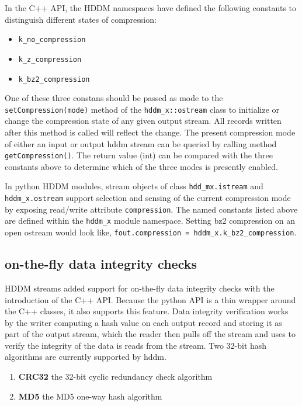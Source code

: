 \documentclass{revtex4}
\begin{document}
In the C++ API, the HDDM namespaces have defined the following constants
to distinguish different states of compression:

\begin{itemize}
\item \texttt{k\_no\_compression}
\item \texttt{k\_z\_compression}
\item \texttt{k\_bz2\_compression}
\end{itemize}

One of these three constans should be passed as mode to the 
\texttt{setCompression(mode)} method of the \texttt{hddm\_x::ostream}
class to initialize or change the compression state of any given output
stream. All records written after this method is called will reflect the
change. The present compression mode of either an input or output hddm
stream can be queried by calling method \texttt{getCompression()}.
The return value (int) can be compared with the three constants above
to determine which of the three modes is presently enabled.

In python HDDM modules, stream objects of class \texttt{hdd\_mx.istream}
and \texttt{hddm\_x.ostream} support selection and sensing of the current
compression mode by exposing read/write attribute \texttt{compression}.
The named constants listed above are defined within the \texttt{hddm\_x}
module namespace. Setting bz2 compression on an open ostream would look
like, \texttt{fout.compression = hddm\_x.k\_bz2\_compression}.

\subsection{on-{}the-{}fly data integrity checks}

HDDM streams added support for on-{}the-{}fly data integrity checks with
the introduction of the C++ API. Because the python API is a thin wrapper
around the C++ classes, it also supports this feature. Data integrity
verification works by the writer computing a hash value on each output
record and storing it as part of the output stream, which the reader then
pulls off the stream and uses to verify the integrity of the data is reads
from the stream. Two 32-{}bit hash algorithms are currently supported by hddm.

\begin{enumerate}
\item{\bf CRC32} the 32-{}bit cyclic redundancy check algorithm
\item{\bf MD5} the MD5 one-{}way hash algorithm
\end{enumerate}
\end{document}
